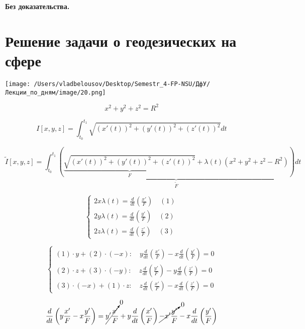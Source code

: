 \documentclass[12pt, a4paper]{report}
\begin{document}
\textbf{Без доказательства.} 

\section{Решение задачи о геодезических на сфере}

\begin{center}
    \texttt{[image: /Users/vladbelousov/Desktop/Semestr\_4-FP-NSU/ДфУ/Лекции\_по\_дням/image/20.png]}
\end{center}

\[ x ^2  +y ^2 + z ^2 = R ^2  \] 

\[ I [x,y,z] = \int_{t_0}^{t_1} \sqrt{(x' (t )) ^2 + (y' (t )) ^2 + (z' (t )) ^2 }dt \] 

\[ \tilde{I } [x,y ,z ] = \int _{t_0}^{t_1}  \underbrace{\left(  \underbrace{\sqrt{(x' (t )) ^2 + (y' (t )) ^2 + (z' (t )) ^2 }}_{F}  + \lambda(t)(x ^2  +y ^2 + z ^2 - R ^2 ) \right)}_{\tilde{F}}  dt  \] 

\[\begin{cases}
    \displaystyle 2 x \lambda (t ) = \frac{d}{dt } \left( \frac{x' }{F}  \right) \quad (1)   \\
    \displaystyle 2 y \lambda (t ) = \frac{d}{dt } \left( \frac{y' }{F}  \right)  \quad (2)\\
    \displaystyle 2 z \lambda (t ) = \frac{d}{dt } \left( \frac{z' }{F}  \right) \quad (3)
\end{cases} \] 

\[ \begin{cases}
    \displaystyle (1) \cdot y + (2) \cdot (-x):\quad  y \frac{d}{dt } \left( \frac{x' }{F} \right) -x \frac{d}{dt } \left( \frac{y' }{F} \right) = 0 \\
    \displaystyle (2) \cdot z + (3 ) \cdot (- y) :\quad z \frac{d}{dt } \left( \frac{y' }{F} \right) -y \frac{d}{dt } \left( \frac{z' }{F} \right) = 0 \\
    \displaystyle (3) \cdot (-x) + (1) \cdot  z : \quad z \frac{d}{dt } \left( \frac{x' }{F} \right) -x \frac{d}{dt } \left( \frac{z' }{F} \right) = 0 
\end{cases} \] 

\[ \frac{d}{dt } \left( y \frac{x ' }{F }  - x \frac{y '}{F}  \right) = \cancelto{0}{y ' \frac{x ' }{F }} + y \frac{d}{dt } \left( \frac{x' }{F}  \right) \cancelto{0}{- x ' \frac{y '}{F}} - x \frac{d}{dt } \left( \frac{y' }{F}  \right) \] 
\end{document}
